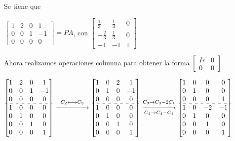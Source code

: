 \documentclass[12pt]{article}
\begin{document}
Se tiene que 

$\begin{bmatrix}
1 & 2 & 0 & 1 \\ 
0 & 0 & 1 & -1 \\ 
0 & 0 & 0 & 0
\end{bmatrix}=PA$, con $\begin{bmatrix}
\textstyle\frac{1}{3} & \textstyle\frac{1}{3} & 0 \\ 
-\textstyle\frac{2}{3} & \textstyle\frac{1}{3} & 0 \\ 
-1 & -1 & 1	
\end{bmatrix} $

Ahora realizamos operaciones columna para obtener la forma
$\left[\begin{array}{c|c}
Ir & 0 \\ 
\hline
0 & 0
\end{array} \right]$

$\begin{bmatrix}
1 & 2 & 0 & 1 \\ 
0 & 0 & 1 & -1 \\ 
0 & 0 & 0 & 0 \\ \hdashline
1 & 0 & 0 & 0 \\ 
0 & 1 & 0 & 0 \\ 
0 & 0 & 1 & 0 \\ 
0 & 0 & 0 & 1
\end{bmatrix}\overset{C_2\longleftrightarrow
C_3}{\xrightarrow{\hspace{1.5cm}}}\begin{bmatrix}
1 & 0 & 2 & 1 \\ 
0 & 1 & 0 & -1 \\ 
0 & 0 & 0 & 0 \\ \hdashline
1 & 0 & 0 & 0 \\ 
0 & 1 & 0 & 0 \\ 
0 & 0 & 1 & 0 \\ 
0 & 0 & 0 & 1
\end{bmatrix}\overset{C_3\rightarrow
C_3-2C_1}{\underset{C_4\rightarrow
C_4-C_1}{\xrightarrow{\hspace{1.5cm}}}}\begin{bmatrix}
1 & 0 & 0 & 0 \\ 
0 & 1 & 0 & 0 \\ 
0 & 0 & 0 & 1 \\ 
\hdashline
1 & 0 & -2 & -1 \\ 
0 & 1 & 0 & 0 \\ 
0 & 0 & 1 & 0 \\ 
0 & 0 & 0 & 1
\end{bmatrix} $
\end{document}
